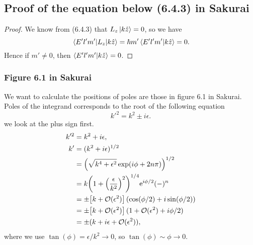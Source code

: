 \documentclass[10pt]{article}
\begin{document}
	\subsection{Proof of the equation below (6.4.3) in Sakurai}
	\begin{proof}
		We know from (6.4.3) that $L_z \ket{k\hat{z}} = 0$, so we have
		\begin{equation}
			\mel{E'l'm'}{L_z}{k \hat{z}} = \hbar m' \braket{E'l'm'}{k\hat{z}} = 0.
		\end{equation}
		Hence if $m' \neq 0$, then $\braket{E'l'm'}{k\hat{z}} = 0$.
	\end{proof}

	\subsubsection{Figure 6.1 in Sakurai}
	We want to calculate the positions of poles are those in figure 6.1 in Sakurai. Poles of the integrand corresponds to the root of the following equation
	\begin{equation}
		k'^2 = k^2 \pm i \epsilon.
	\end{equation}
	we look at the plus sign first.
	\begin{align*}
		k'^2 &= k^2 + i \epsilon, \\
		k' &= (k^2 + i \epsilon)^{1/2} \\
		&= \qty(\sqrt{k^4 + \epsilon^2} \exp(i\phi + 2n \pi))^{1/2} \\
		&= k \qty(1+ \qty(\frac{\epsilon}{k^2})^2)^{1/4} {\mathrm{e}}^{i \phi /2} (-)^n \\
		&= \pm \qty[k+ \mathcal{O}(\epsilon^2)] (\cos(\phi/2) + i \sin(\phi/2)) \\
		&= \pm \qty[k+ \mathcal{O}(\epsilon^2)] (1 + \mathcal{O}(\epsilon^2) + i \phi/2) \\
		&= \pm (k + i \epsilon + \mathcal{O}(\epsilon^2)),
	\end{align*}
	where we use $\tan(\phi) = \epsilon/k^2 \to 0$, so $\tan(\phi) \sim \phi \to 0$.
\end{document}

